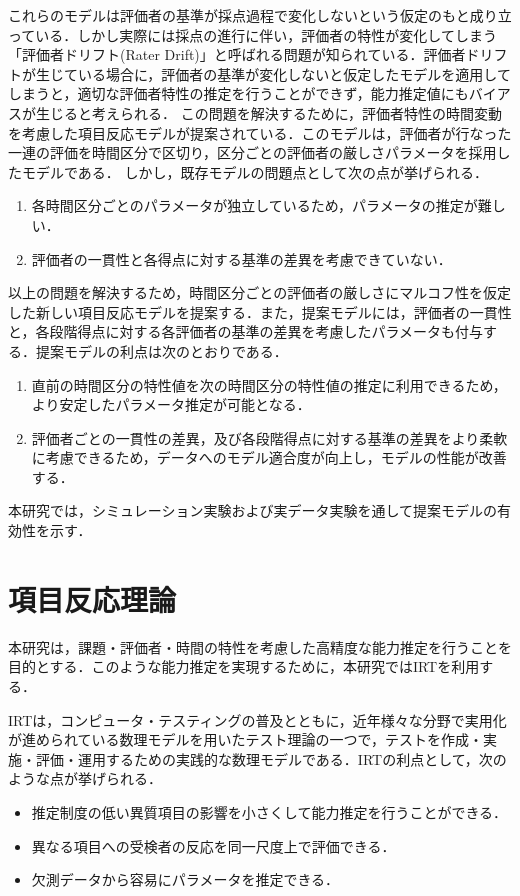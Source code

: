 \documentclass[a4paper,11pt,oneside,openany]{jsbook}
\begin{document}
これらのモデルは評価者の基準が採点過程で変化しないという仮定のもと成り立っている．しかし実際には採点の進行に伴い，評価者の特性が変化してしまう「評価者ドリフト(Rater Drift)」と呼ばれる問題が知られている．評価者ドリフトが生じている場合に，評価者の基準が変化しないと仮定したモデルを適用してしまうと，適切な評価者特性の推定を行うことができず，能力推定値にもバイアスが生じると考えられる．
この問題を解決するために，評価者特性の時間変動を考慮した項目反応モデルが提案されている\cite{raterdrift}．このモデルは，評価者が行なった一連の評価を時間区分で区切り，区分ごとの評価者の厳しさパラメータを採用したモデルである．
しかし，既存モデルの問題点として次の点が挙げられる．
\begin{enumerate}
  \item 各時間区分ごとのパラメータが独立しているため，パラメータの推定が難しい．
  \item 評価者の一貫性と各得点に対する基準の差異を考慮できていない．
\end{enumerate}  
以上の問題を解決するため，時間区分ごとの評価者の厳しさにマルコフ性を仮定した新しい項目反応モデルを提案する．また，提案モデルには，評価者の一貫性と，各段階得点に対する各評価者の基準の差異を考慮したパラメータも付与する．提案モデルの利点は次のとおりである．
\begin{enumerate}
  \item 直前の時間区分の特性値を次の時間区分の特性値の推定に利用できるため，より安定したパラメータ推定が可能となる．
  \item 評価者ごとの一貫性の差異，及び各段階得点に対する基準の差異をより柔軟に考慮できるため，データへのモデル適合度が向上し，モデルの性能が改善する．
\end{enumerate}
本研究では，シミュレーション実験および実データ実験を通して提案モデルの有効性を示す．
\newpage

\chapter{項目反応理論}
本研究は，課題・評価者・時間の特性を考慮した高精度な能力推定を行うことを目的とする．このような能力推定を実現するために，本研究ではIRTを利用する．

IRTは，コンピュータ・テスティングの普及とともに，近年様々な分野で実用化が進められている数理モデルを用いたテスト理論の一つで，テストを作成・実施・評価・運用するための実践的な数理モデルである\cite{IRTtext,IRTLord}．IRTの利点として，次のような点が挙げられる\cite{IRTUtoUeno}．
\begin{itemize}
\item 推定制度の低い異質項目の影響を小さくして能力推定を行うことができる．
\item 異なる項目への受検者の反応を同一尺度上で評価できる．
\item 欠測データから容易にパラメータを推定できる．
\end{itemize}
\end{document}
